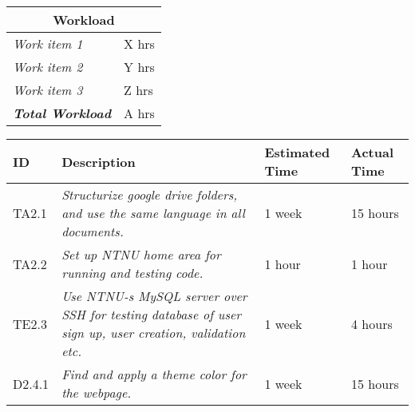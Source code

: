 \documentclass[11pt]{report}
\begin{document}
\begin{minipage}{\linewidth}
\setlength{\tabcolsep}{15pt}
\centering
{}
\begin{tabular}{ |l|l| }
	\hline
	\multicolumn{2}{|c|}{\cellcolor{gray!25} Workload} \\
	\hline
	\it{Work item 1} & X hrs\\
	\it{Work item 2} & Y hrs\\
	\it{Work item 3} & Z hrs\\
	\hline
	\textbf{\textit{Total Workload}} & A hrs\\
	\hline
\end{tabular}
\end{minipage}

\begin{minipage}{\linewidth}
\setlength{\tabcolsep}{12pt}
\centering
{}
\begin{tabular}{|p{1cm}|p{4cm}|p{2cm}|p{2cm}|}
\hline
\cellcolor{gray!25} ID & \cellcolor{gray!25} Description & \cellcolor{gray!25} Estimated Time & \cellcolor{gray!25} Actual Time \\
\hline
TA2.1 & \it{Structurize google drive folders, and use the same language in all documents.} & 1 week & 15 hours \\
TA2.2 & \it{Set up NTNU home area for running and testing code.} & 1 hour & 1 hour \\
TE2.3 & \it{Use NTNU-s MySQL server over SSH for testing database of user sign up, user creation, validation etc. } & 1 week & 4 hours \\
D2.4.1 & \it{Find and apply a theme color for the webpage. } & 1 week & 15 hours \\
\hline
\end{tabular}
\end{minipage}
\end{document}
